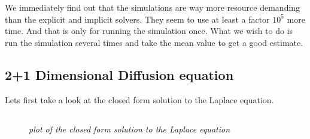 \documentclass[english,a4paper,12pt]{article}
\begin{document}
We immediately find out that the simulations are way more resource demanding than the explicit and implicit solvers. They seem to
use at least a factor $10^5$ more time. And that is only for running the simulation once. What we wish to do is run the simulation several
times and take the mean value to get a good estimate.


\subsection*{2+1 Dimensional Diffusion equation}

Lets first take a look at the closed form solution to the Laplace equation. 

\subsection*{}
\begin{figure}[H]
 \begin{center}
 \end{center}
 \caption{\textit{plot of the closed form solution to the Laplace equation}}
 \label{fig:edge}
\end{figure}
\end{document}
